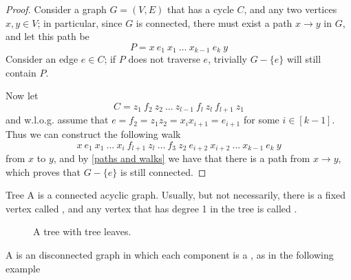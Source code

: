 \documentclass[a4paper, 12pt]{report}
\begin{document}
    \begin{proof}
        Consider a graph $G = (V, E)$ that has a cycle $C$, and any two vertices $x, y \in V$; in particular, since $G$ is connected, there must exist a path $x \to y$ in $G$, and let this path be $$P = x \ e_1 \ x_1 \ \ldots \ x_{k - 1} \ e_k \ y$$ Consider an edge $e \in C$; if $P$ does not traverse $e$, trivially $G - \{e\}$ will still contain $P$.

        Now let $$C = z_1 \ f_2 \ z_2 \ \ldots \ z_{l- 1} \ f_l \ z_l \ f_{l + 1} \ z_1$$ and w.l.o.g. assume that $e = f_2 = z_1 z_2 = x_i x_{i + 1} = e_{i + 1}$ for some $i \in [k - 1]$. Thus we can construct the following walk $$x \ e_1 \ x_1 \ \ldots \ x_i \ f_{l + 1} \ z_l \ \ldots \ f_3 \ z_2 \ e_{i + 2} \ x_{i + 2} \ \ldots \ x_{k - 1} \ e_k \ y$$ from $x$ to $y$, and by \cref{paths and walks} we have that there is a path from $x \to y$, which proves that $G - \{e\}$ is still connected.
    \end{proof}

    \begin{frameddefn}{Tree}
        A  is a connected acyclic graph. Usually, but not necessarily, there is a fixed vertex called , and any vertex that has degree 1 in the tree is called .
    \end{frameddefn}
    
    \begin{figure}[H]
        \centering
        \caption{A tree with tree leaves.}
    \end{figure}

    A  is an disconnected graph in which each component is a , as in the following example
\end{document}
